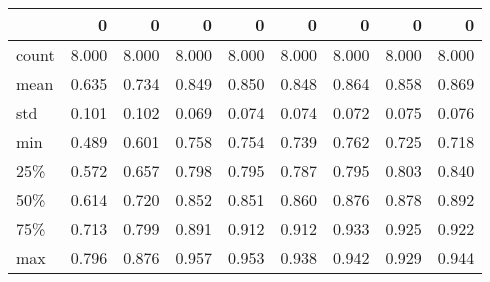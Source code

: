 \begin{tabular}{lrrrrrrrr}
\toprule
{} &      0 &      0 &      0 &      0 &      0 &      0 &      0 &      0 \\
\midrule
count &  8.000 &  8.000 &  8.000 &  8.000 &  8.000 &  8.000 &  8.000 &  8.000 \\
mean  &  0.635 &  0.734 &  0.849 &  0.850 &  0.848 &  0.864 &  0.858 &  0.869 \\
std   &  0.101 &  0.102 &  0.069 &  0.074 &  0.074 &  0.072 &  0.075 &  0.076 \\
min   &  0.489 &  0.601 &  0.758 &  0.754 &  0.739 &  0.762 &  0.725 &  0.718 \\
25\%   &  0.572 &  0.657 &  0.798 &  0.795 &  0.787 &  0.795 &  0.803 &  0.840 \\
50\%   &  0.614 &  0.720 &  0.852 &  0.851 &  0.860 &  0.876 &  0.878 &  0.892 \\
75\%   &  0.713 &  0.799 &  0.891 &  0.912 &  0.912 &  0.933 &  0.925 &  0.922 \\
max   &  0.796 &  0.876 &  0.957 &  0.953 &  0.938 &  0.942 &  0.929 &  0.944 \\
\bottomrule
\end{tabular}
